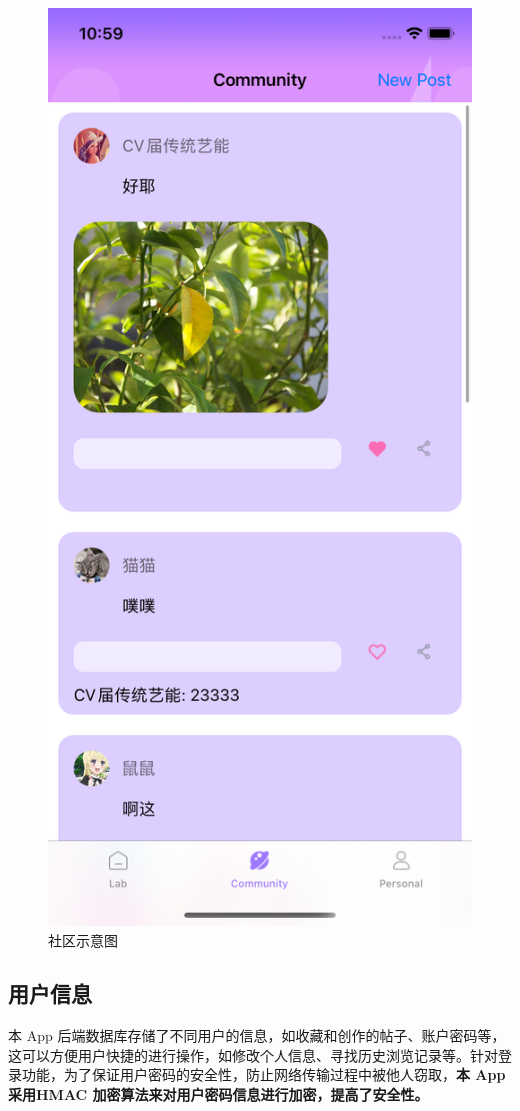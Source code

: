 \begin{figure}[H]
    \centering
    \includegraphics[width=0.5
    \textwidth]{figures/社区.png}
    \caption{社区示意图}
    \label{fig:my_label}
\end{figure}

\subsection{用户信息}

本 App 后端数据库存储了不同用户的信息，如收藏和创作的帖子、账户密码等，这可以方便用户快捷的进行操作，如修改个人信息、寻找历史浏览记录等。针对登录功能，为了保证用户密码的安全性，防止网络传输过程中被他人窃取，\textbf{本 App 采用HMAC 加密算法来对用户密码信息进行加密，提高了安全性。}

